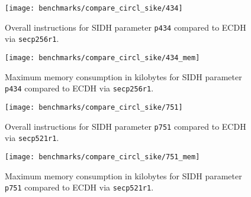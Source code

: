 \begin{figure}[H]
  \centering
  \texttt{[image: benchmarks/compare\_circl\_sike/434]}
  \caption[Overall instructions of SIKE and CIRCL using \texttt{p434}]
  {Overall instructions for \gls{SIDH} parameter \texttt{p434} compared to \gls{ECDH} via \texttt{secp256r1}.}
  \label{fig:results_opt_434}
\end{figure}

\begin{figure}[H]
  \centering
  \texttt{[image: benchmarks/compare\_circl\_sike/434\_mem]}
  \caption[Maximum memory consumption of SIKE and CIRCL using \texttt{p434}]
  {Maximum memory consumption in kilobytes for \gls{SIDH} parameter \texttt{p434} compared to \gls{ECDH} via \texttt{secp256r1}.}
  \label{fig:results_opt_434_mem}
\end{figure}

\begin{figure}[H]
  \centering
  \texttt{[image: benchmarks/compare\_circl\_sike/751]}
  \caption[Overall instructions of SIKE and CIRCL using \texttt{p751}]
  {Overall instructions for \gls{SIDH} parameter \texttt{p751} compared to \gls{ECDH} via \texttt{secp521r1}.}
  \label{fig:results_opt_751}
\end{figure}

\begin{figure}[H]
  \centering
  \texttt{[image: benchmarks/compare\_circl\_sike/751\_mem]}
  \caption[Maximum memory consumption  of SIKE and CIRCL using \texttt{p751}]
  {Maximum memory consumption in kilobytes for \gls{SIDH} parameter \texttt{p751} compared to \gls{ECDH} via \texttt{secp521r1}.}
  \label{fig:results_opt_751_mem}
\end{figure}

